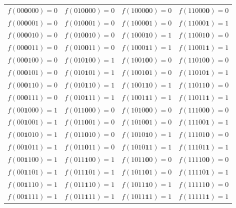 \begin{longtable}{ c c c c}

  $f(00\bm{0}000) = 0$ & 
  $f(010\bm{0}00) = 0$ & 
  $f(1000\bm{0}0) = 0$ & 
  $f(11000\bm{0}) = 0$ \\ 

  $f(00\bm{0}001) = 0$ & 
  $f(010\bm{0}01) = 0$ & 
  $f(1000\bm{0}1) = 0$ & 
  $f(11000\bm{1}) = 1$ \\ 

  $f(00\bm{0}010) = 0$ & 
  $f(010\bm{0}10) = 0$ & 
  $f(1000\bm{1}0) = 1$ & 
  $f(11001\bm{0}) = 0$ \\ 

  $f(00\bm{0}011) = 0$ & 
  $f(010\bm{0}11) = 0$ & 
  $f(1000\bm{1}1) = 1$ & 
  $f(11001\bm{1}) = 1$ \\ 

  $f(00\bm{0}100) = 0$ & 
  $f(010\bm{1}00) = 1$ & 
  $f(1001\bm{0}0) = 0$ & 
  $f(11010\bm{0}) = 0$ \\ 

  $f(00\bm{0}101) = 0$ & 
  $f(010\bm{1}01) = 1$ & 
  $f(1001\bm{0}1) = 0$ & 
  $f(11010\bm{1}) = 1$ \\ 

  $f(00\bm{0}110) = 0$ & 
  $f(010\bm{1}10) = 1$ & 
  $f(1001\bm{1}0) = 1$ & 
  $f(11011\bm{0}) = 0$ \\ 

  $f(00\bm{0}111) = 0$ & 
  $f(010\bm{1}11) = 1$ & 
  $f(1001\bm{1}1) = 1$ & 
  $f(11011\bm{1}) = 1$ \\ 

  $f(00\bm{1}000) = 1$ & 
  $f(011\bm{0}00) = 0$ & 
  $f(1010\bm{0}0) = 0$ & 
  $f(11100\bm{0}) = 0$ \\ 

  $f(00\bm{1}001) = 1$ & 
  $f(011\bm{0}01) = 0$ & 
  $f(1010\bm{0}1) = 0$ & 
  $f(11100\bm{1}) = 1$ \\ 

  $f(00\bm{1}010) = 1$ & 
  $f(011\bm{0}10) = 0$ & 
  $f(1010\bm{1}0) = 1$ & 
  $f(11101\bm{0}) = 0$ \\ 

  $f(00\bm{1}011) = 1$ & 
  $f(011\bm{0}11) = 0$ & 
  $f(1010\bm{1}1) = 1$ & 
  $f(11101\bm{1}) = 1$ \\ 

  $f(00\bm{1}100) = 1$ & 
  $f(011\bm{1}00) = 1$ & 
  $f(1011\bm{0}0) = 0$ & 
  $f(11110\bm{0}) = 0$ \\ 

  $f(00\bm{1}101) = 1$ & 
  $f(011\bm{1}01) = 1$ & 
  $f(1011\bm{0}1) = 0$ & 
  $f(11110\bm{1}) = 1$ \\ 

  $f(00\bm{1}110) = 1$ & 
  $f(011\bm{1}10) = 1$ & 
  $f(1011\bm{1}0) = 1$ & 
  $f(11111\bm{0}) = 0$ \\ 

  $f(00\bm{1}111) = 1$ & 
  $f(011\bm{1}11) = 1$ & 
  $f(1011\bm{1}1) = 1$ & 
  $f(11111\bm{1}) = 1$ \\ 
\end{longtable}

